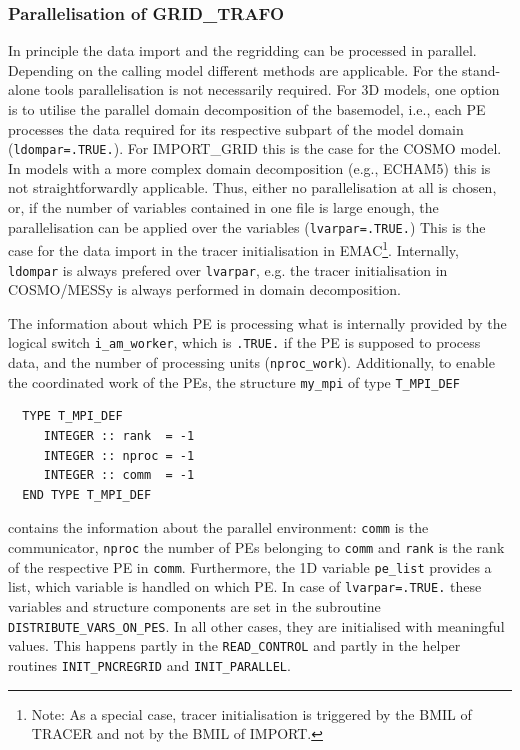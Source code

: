 \documentclass[11pt,twoside]{report}
\begin{document}
\subsubsection{Parallelisation of GRID\_TRAFO\label{IGPAR}}
In principle the data import and the regridding can be processed in
 parallel.
 Depending on the calling model different methods are applicable.
For the stand-alone tools parallelisation is not necessarily required.
For 3D models, one option is to utilise the parallel domain
decomposition of the basemodel, i.e., each PE processes the data
required for its respective subpart of the model domain (\verb|ldompar=.TRUE.|).
For IMPORT\_GRID this is the case for the COSMO model. 
In models with a more complex domain decomposition (e.g., ECHAM5) this is not
straightforwardly applicable. Thus, either no parallelisation at all is
chosen, or, if the number of variables contained in one file is large enough,
the parallelisation can be applied over the variables
(\verb|lvarpar=.TRUE.|) This is the case for the data import
in the tracer initialisation in EMAC\footnote{Note: As a special case,
tracer initialisation is triggered by the BMIL of TRACER and not by the
BMIL of IMPORT.}. 
Internally, \verb|ldompar| is always prefered over \verb|lvarpar|, e.g. the
tracer initialisation in COSMO/MESSy is always performed in domain
decomposition. 

The information about which PE is processing what is internally provided by the
logical switch \verb|i_am_worker|, which is \verb|.TRUE.| if the PE is
supposed to process data, and the number of processing units
(\verb|nproc_work|). Additionally, to enable the coordinated work of the PEs,
the structure \verb|my_mpi| of type \verb|T_MPI_DEF| \label{IGtypeMPI}
\begin{verbatim}
  TYPE T_MPI_DEF
     INTEGER :: rank  = -1 
     INTEGER :: nproc = -1 
     INTEGER :: comm  = -1 
  END TYPE T_MPI_DEF
\end{verbatim}
contains the information about the parallel environment: \verb|comm|
is the communicator, \verb|nproc| the number of PEs belonging
to \verb|comm| and \verb|rank| is the rank of the respective PE in
\verb|comm|.
Furthermore, the 1D variable \verb|pe_list| provides a list, which variable is
handled on which PE. In case of 
\verb|lvarpar=.TRUE.| these variables and structure components  are
set in the subroutine  
\verb|DISTRIBUTE_VARS_ON_PES|. In all other cases, they are initialised
with meaningful values. This happens partly in the \verb|READ_CONTROL|
and partly in the helper routines \verb|INIT_PNCREGRID| and 
\verb|INIT_PARALLEL|.
\end{document}
